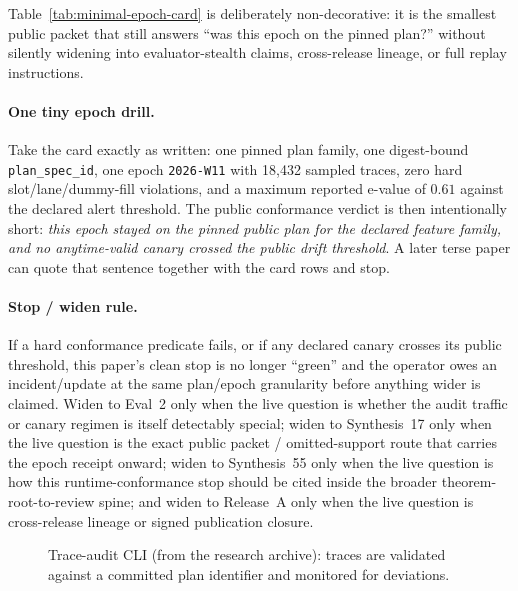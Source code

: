 \documentclass[11pt]{article}
\begin{document}
Table~\ref{tab:minimal-epoch-card} is deliberately non-decorative: it is the smallest public packet that still answers ``was this epoch on the pinned plan?'' without silently widening into evaluator-stealth claims, cross-release lineage, or full replay instructions.

\paragraph{One tiny epoch drill.}
Take the card exactly as written: one pinned plan family, one digest-bound \texttt{plan\_spec\_id}, one epoch \texttt{2026-W11} with 18{,}432 sampled traces, zero hard slot/lane/dummy-fill violations, and a maximum reported e-value of $0.61$ against the declared alert threshold. The public conformance verdict is then intentionally short: \emph{this epoch stayed on the pinned public plan for the declared feature family, and no anytime-valid canary crossed the public drift threshold}. A later terse paper can quote that sentence together with the card rows and stop.

\paragraph{Stop / widen rule.}
If a hard conformance predicate fails, or if any declared canary crosses its public threshold, this paper's clean stop is no longer ``green'' and the operator owes an incident/update at the same plan/epoch granularity before anything wider is claimed. Widen to Eval~2 only when the live question is whether the audit traffic or canary regimen is itself detectably special; widen to Synthesis~17 only when the live question is the exact public packet / omitted-support route that carries the epoch receipt onward; widen to Synthesis~55 only when the live question is how this runtime-conformance stop should be cited inside the broader theorem-root-to-review spine; and widen to Release~A only when the live question is cross-release lineage or signed publication closure.\cite{series:advantagecontracts,series:workedexample,series:seriesspines,series:releaseproperty}

\begin{figure}[t]
  \centering
  \caption{Trace-audit CLI (from the research archive): traces are validated against a committed plan identifier and monitored for deviations.}
  \label{fig:cli}
\end{figure}
\end{document}
